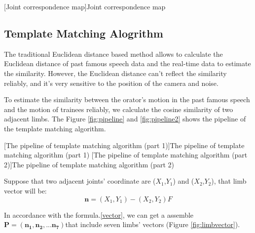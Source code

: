 [Joint correspondence map]{Joint correspondence map}

\subsection*{Template Matching Alogrithm}
\par The traditional Euclidean distance based method allows to calculate the Euclidean distance of past famous speech data and the real-time data to estimate the similarity. However, the Euclidean distance can't reflect the similarity reliably, and it's very sensitive to the position of the camera and noise. 
\par To estimate the similarity between the orator's motion in the past famous speech and the motion of trainees reliably, we calculate the cosine similarity of two adjacent limbs. The Figure \ref{fig:pipeline} and \ref{fig:pipeline2} shows the pipeline of the template matching algorithm. 

[The pipeline of template matching algorithm (part 1)]{The pipeline of template matching algorithm (part 1)}
[The pipeline of template matching algorithm (part 2)]{The pipeline of template matching algorithm (part 2)}

\par Suppose that two adjacent joints' coordinate are ($X_{1}$,$Y_{1}$) and ($X_{2}$,$Y_{2}$), that limb vector will be:
\begin{equation}
	\bm {n}= \left (X_{1} , Y_{1}\right )-\left (X_{2} , Y_{2}\right )F
\label{vector}
\end{equation}
	
\par In accordance with the formula.\ref{vector}, we can get a assemble $\bm {P = (n_{1},n_{2},...n_{7})}$that include seven limbs' vectors (Figure \ref{fig:limbvector}).

